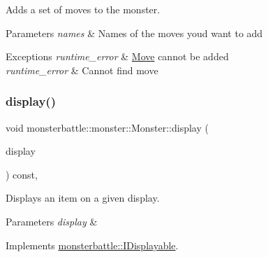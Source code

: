Adds a set of moves to the monster. 


\begin{DoxyParams}{Parameters}
{\em names} & Names of the moves you\textquotesingle{}d want to add\\
\hline
\end{DoxyParams}

\begin{DoxyExceptions}{Exceptions}
{\em runtime\+\_\+error} & \hyperlink{classmonsterbattle_1_1monster_1_1Move}{Move} cannot be added \\
\hline
{\em runtime\+\_\+error} & Cannot find move \\
\hline
\end{DoxyExceptions}
\mbox{\label{classmonsterbattle_1_1monster_1_1Monster_af821d28493e308134ed5d7cad2e567a4}} 
\subsubsection{\texorpdfstring{display()}{display()}}
{\footnotesize\ttfamily void monsterbattle\+::monster\+::\+Monster\+::display (\begin{DoxyParamCaption}\item[{\hyperlink{structmonsterbattle_1_1IDisplay}{I\+Display} \&}]{display }\end{DoxyParamCaption}) const\hspace{0.3cm}{\ttfamily [override]}, {\ttfamily [virtual]}}



Displays an item on a given display. 


\begin{DoxyParams}{Parameters}
{\em display} & \\
\hline
\end{DoxyParams}


Implements \hyperlink{structmonsterbattle_1_1IDisplayable_a2e7b5b2259cd0f00d65a99752072e66e}{monsterbattle\+::\+I\+Displayable}.

\mbox{\label{classmonsterbattle_1_1monster_1_1Monster_a6d5c8e27f45ca19e8a33a5aa093a4e50}} 
